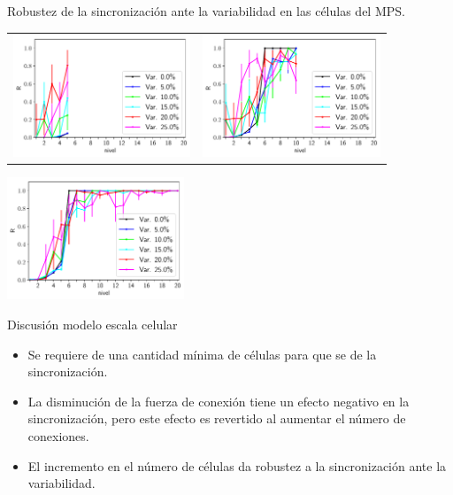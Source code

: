 \documentclass[xcolor=table, xllnames]{beamer}
\begin{document}
\begin{frame}{Robustez de la sincronización ante la variabilidad en las células del MPS.}

\centering
\begin{tabular}{c c}
	\includegraphics[width=5.3cm]{Figuras/figuraVCIVer69_preAv.pdf}&
	\includegraphics[width=5.3cm]{Figuras/figuraVCIVer71_preAv.pdf} 
\end{tabular}
	\includegraphics[width=5.3cm]{Figuras/figuraVCIVer68_preAv.pdf} %
\end{frame}

\begin{frame} {Discusión modelo escala celular}
\begin{itemize}
	\item Se requiere de una cantidad mínima de células para que se de la sincronización.
	
	\item La disminución de la fuerza de conexión tiene un efecto negativo en la sincronización, pero este efecto es revertido al aumentar el número de conexiones.
	
	\item {El incremento en el n\'umero de c\'elulas da robustez a la sincronización ante la variabilidad.}
	
	
\end{itemize}
\end{frame}
\end{document}
